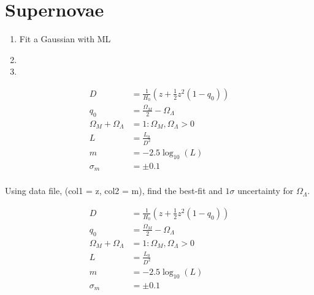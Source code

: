 \section{Supernovae}

\begin{enumerate}[label=\textbf{\Alph*}.]
    \item Fit a Gaussian with ML

    \item 

    \item 

\end{enumerate}


\begin{align*}
    D &= \frac{1}{H_0} \left(z + \frac{1}{2}z^2 (1-q_0)\right)\\
    q_0 &= \frac{\Omega_M}{2} - \Omega_\Lambda\\
    \Omega_M + \Omega_\Lambda &= 1: \Omega_M, \Omega_\Lambda > 0\\
    L &= \frac{L_0}{D^2}\\
    m &= -2.5\log_{10}(L)\\
    \sigma_m &= \pm 0.1 \\
\end{align*}

Using data file, (col1 = z, col2 = m), find the best-fit and $1\sigma$ uncertainty for $\Omega_\Lambda$.

\begin{align*}
    D &= \frac{1}{H_0} \left(z + \frac{1}{2}z^2 (1-q_0)\right)\\
    q_0 &= \frac{\Omega_M}{2} - \Omega_\Lambda\\
    \Omega_M + \Omega_\Lambda &= 1: \Omega_M, \Omega_\Lambda > 0\\
    L &= \frac{L_0}{D^2}\\
    m &= -2.5\log_{10}(L)\\
    \sigma_m &= \pm 0.1 \\
\end{align*}
